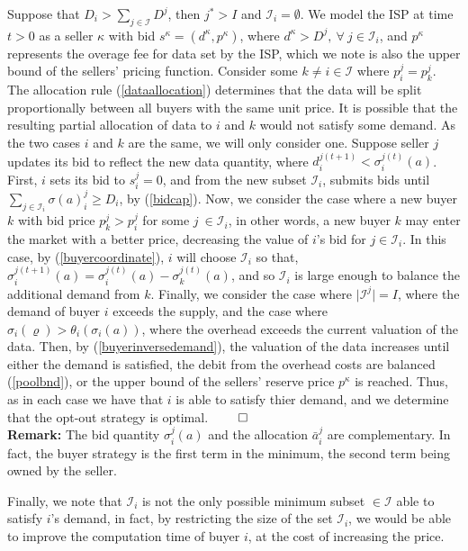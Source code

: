 \documentclass[sigconf, anonymous]{acmart}
\newcommand{\mcI}{\mathcal{I}}
\newcommand{\g}{\sigma}
\theoremstyle{definition}
\begin{document}
Suppose that $D_i >
\sum_{j\in\mcI}D^j$, then $j^* > I$ and $\mcI_i = \emptyset$. 
We model the ISP at time $t>0$ as a seller $\kappa$ with bid $s^\kappa
=(d^\kappa, p^\kappa)$,
where $d^\kappa > D^j, \
\forall \ j\in\mcI_i$, and
$p^\kappa$ represents the overage fee for data set by the ISP, which we note is also the upper bound of the sellers'
pricing function.
Consider some $k \ne i \in \mcI$ where $p_i^j = p_k^j$. 
The allocation rule (\ref{dataallocation}) determines that the data will be
split proportionally
between all buyers with the same unit price. 
It is possible that the resulting partial allocation of data to $i$ and $k$
would not satisfy some demand. As the two cases $i$ and $k$ are the same, we
will only consider one. Suppose seller $j$ updates its
bid to reflect the new data quantity, where
$d_i^{j(t+1)} < \g_i^{j(t)}(a)$. First, $i$ sets its bid to $s_i^j = 0$, and
from the new subset $\mcI_i$, submits bids until
$\sum_{j\in\mcI_i} \g(a)_i^j \ge D_i$, by (\ref{bidcap}).
Now, we consider the case where a new buyer $k$ with bid
price $p_k^j > p_i^j$ for some $j \ \in \mcI_i$, in other
words, a new buyer $k$ may enter the market with a better price, decreasing the
value of $i$'s bid for $j\in\mcI_i$. In this case, by (\ref{buyercoordinate}),
$i$ will choose $\mcI_i$ so that, $\g_i^{j(t+1)}(a) = \g_i^{j(t)}(a) - \g_k^{j(t)}(a)$,
and so $\mcI_i$ is large enough to balance the additional demand from
$k$. Finally, we consider the case where $\vert\mcI^j\vert = I$, where the
demand of buyer $i$ exceeds the supply, and the case where $\g_i(\varrho) >
\theta_i(\g_i(a))$, where the overhead exceeds the current valuation of the
data. Then, by (\ref{buyerinversedemand}), the valuation of the data increases until either
the demand is satisfied, the debit from the overhead costs are balanced
(\ref{poolbnd}), or the upper bound of the sellers' reserve price
$p^\kappa$ is reached. Thus, as in each case we have that $i$ is able to satisfy thier demand,
and we determine that the opt-out strategy is optimal.
$\qed$\\
\textbf{Remark:} The bid quantity $\g_i^j(a)$ and the allocation $\bar{a}_i^j$
are complementary. In fact, the buyer strategy is the first term in the
minimum, the second term being owned by the seller.

Finally, we note that $\mcI_i$ is not the only
possible minimum subset $\in\mcI$ able to satisfy $i$'s demand, in fact, by
restricting the size of the set $\mcI_i$, we would be able to improve the
computation time of buyer $i$, at the cost of increasing the price.
\end{document}
